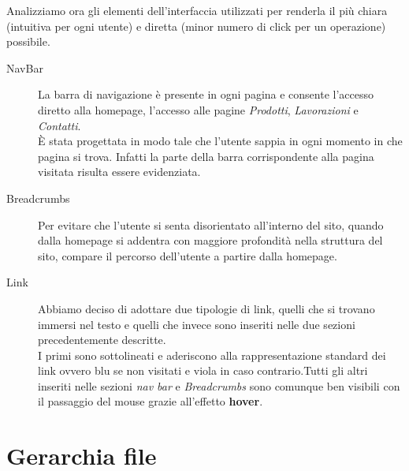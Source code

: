 \documentclass[11pt]{article}
\begin{document}
Analizziamo ora gli elementi dell'interfaccia utilizzati per renderla il più chiara (intuitiva per ogni utente) e diretta (minor numero di click per un operazione) possibile.
\begin{description}
	\item [NavBar] La barra di navigazione è presente in ogni pagina e consente l'accesso diretto alla homepage, l'accesso alle pagine \textit{Prodotti}, \textit{Lavorazioni} e \textit{Contatti}.
	\\È stata progettata in modo tale che l'utente sappia in ogni momento in che pagina si trova. Infatti la parte della barra corrispondente alla pagina visitata risulta essere evidenziata.
	\item [Breadcrumbs] Per evitare che l'utente si senta disorientato all'interno del sito, quando dalla homepage si addentra con maggiore profondità nella struttura del sito, compare il percorso dell'utente a partire dalla homepage.
	\item [Link] Abbiamo deciso di adottare due tipologie di link, quelli che si trovano immersi nel testo e quelli che invece sono inseriti nelle due sezioni precedentemente descritte.
	\\ I primi sono sottolineati e aderiscono alla rappresentazione standard dei link ovvero blu se non visitati e viola in caso contrario.Tutti gli altri inseriti nelle sezioni \textit{nav bar} e \textit{Breadcrumbs} sono comunque ben visibili con il passaggio del mouse grazie all'effetto \textbf{hover}.
\end{description}

\newpage
\section{Gerarchia file}
\end{document}
